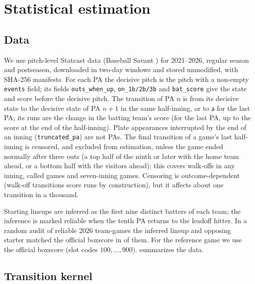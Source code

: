 \documentclass[11pt]{article}
\theoremstyle{definition}
\theoremstyle{remark}
\newcommand{\abs}{\mathsf{a}}
\begin{document}
\section{Statistical estimation}\label{sec:estimation}

\subsection{Data}\label{sec:data}

We use pitch-level Statcast data (Baseball Savant \cite{savant}) for 2021--2026, regular season and postseason,
downloaded in two-day windows and stored unmodified, with SHA-256 manifests. For each PA the
decisive pitch is the pitch with a non-empty \texttt{events} field; its fields
\texttt{outs\_when\_up}, \texttt{on\_1b/2b/3b} and \texttt{bat\_score} give the state and score
before the decisive pitch. The transition of PA $n$ is from its decisive state to the decisive
state of PA $n+1$ in the same half-inning, or to $\abs$ for the last PA; its runs are the change in
the batting team's score (for the last PA, up to the score at the end of the half-inning).
Plate appearances interrupted by the end of an inning (\texttt{truncated\_pa}) are not PAs. The
final transition of a game's last half-inning is censored, and excluded from estimation, unless
the game ended normally after three outs (a top half of the ninth or later with the home team ahead,
or a bottom half with the visitors ahead); this covers walk-offs in any inning, called games and
seven-inning games. Censoring is outcome-dependent (walk-off transitions score runs by
construction), but it affects about one transition in a thousand.

Starting lineups are inferred as the first nine distinct batters of each team; the inference is
marked reliable when the tenth PA returns to the leadoff hitter. In a random audit of \EzeroN{}
reliable 2026 team-games the inferred lineup and opposing starter matched the official boxscore
in \EzeroMatch{} of them. For the
reference game we use the official boxscore (slot codes $100,\dots,900$).
 summarizes the data.



\subsection{Transition kernel}
\end{document}
